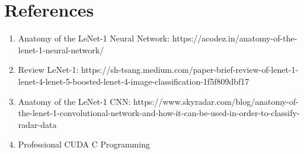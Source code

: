 \documentclass[a4paper]{report}
\begin{document}
\section{References}

\begin{enumerate}
\item Anatomy of the LeNet-1 Neural Network: https://acodez.in/anatomy-of-the-lenet-1-neural-network/
\item Review LeNet-1: https://sh-tsang.medium.com/paper-brief-review-of-lenet-1-lenet-4-lenet-5-boosted-lenet-4-image-classification-1f5f809dbf17
\item Anatomy of the LeNet-1 CNN: https://www.skyradar.com/blog/anatomy-of-the-lenet-1-convolutional-network-and-how-it-can-be-used-in-order-to-classify-radar-data
\item Professional CUDA C Programming
\end{enumerate}
\end{document}
